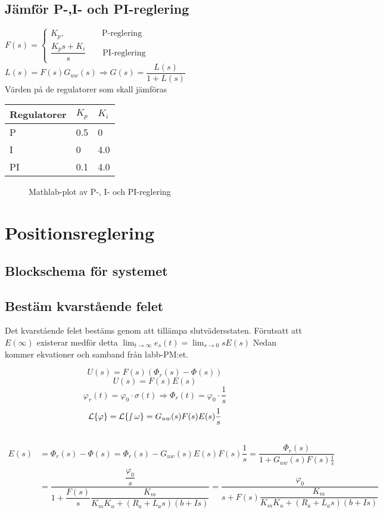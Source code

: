 \documentclass[11pt]{article}
\begin{document}
\subsection{Jämför P-,I- och PI-reglering}
$
F(s)=
\begin{cases}
K_p, \quad \quad \quad \quad \ \ 
 \text{P-reglering} \\[0.5em]
\dfrac{K_ps+K_i}{s} \quad \quad \text{PI-reglering}
\end{cases}
$
$L(s)=F(s)G_{uw}(s)\Rightarrow G(s)=\dfrac{L(s)}{1+L(s)}$\\[0.5em]
Värden på de regulatorer som skall jämföras\\[1em]
\begin{tabular}{|l|l|l|}
\hline
Regulatorer&$K_p$&$K_i$ \\ \hline \hline
P&0.5&0 \\ \hline
I&0&4.0 \\ \hline
PI&0.1&4.0 \\ \hline
\end{tabular}
\begin{figure}[h!]
\caption{Mathlab-plot av P-, I- och PI-reglering}
\end{figure}
\section{Positionsreglering}
\subsection{Blockschema för systemet}

\subsection{Bestäm kvarstående felet}
Det kvarstående felet bestäms genom att tillämpa slutvädersstaten. Förutsatt att $E(\infty)$ existerar medför detta $\lim_{t \to \infty}e_s(t) = \lim_{s \to 0}sE(s)$ Nedan kommer ekvationer och samband från labb-PM:et.

\begin{equation}
U(s) = F(s)(\Phi_r(s)-\Phi(s))
\end{equation}
\begin{equation}
U(s) = F(s)E(s)
\end{equation}
\begin{equation}
\varphi_r(t)= \varphi_0\cdot\sigma(t) \Rightarrow
\Phi_r(t)=\varphi_0\cdot\dfrac{1}{s}
\end{equation} 
\begin{equation}
\mathcal{L}\{\varphi\}=\mathcal{L}\{\smallint\omega \} = G_{uw}(s)F(s)E(s)\dfrac{1}{s}
\end{equation}\\[1em]
\begin{equation*}
\begin{split}
E(s)&=\Phi_r(s)-\Phi(s)=\Phi_r(s)-G_{uw}(s)E(s)F(s)\dfrac{1}{s} = \dfrac{\Phi_r(s)}{1+G_{uw}(s)F(s)\frac{1}{s}}\\
&=\dfrac{\dfrac{\varphi_0}{s}}{1+\dfrac{F(s)}{s}\dfrac{K_m}{K_mK_u+(R_a+L_as)(b+Is)}} = \dfrac{\varphi_0}{s+F(s)\dfrac{K_m}{K_mK_u+(R_a+L_as)(b+Is)}}
\end{split}
\end{equation*}
\end{document}
